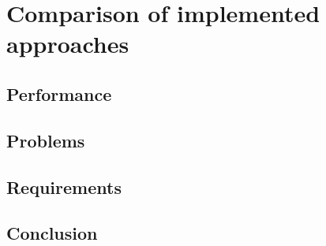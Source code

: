 \section{Comparison of implemented approaches}

\subsection{Performance}
\subsection{Problems}
\subsection{Requirements}
\subsection{Conclusion}